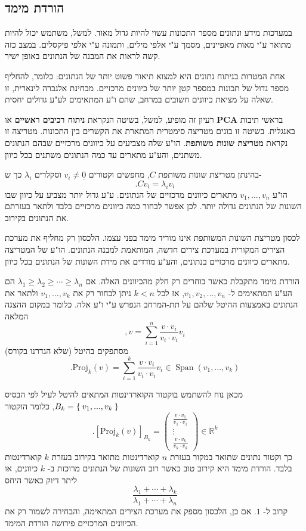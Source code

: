 \documentclass[12pt]{report}
\theoremstyle{plain}
\theoremstyle{definition}
\newcommand{\R}{\mathbb{R}}
\newcommand{\0}{\mathbf{0}}
\DeclareMathOperator{\Span}{Span}
\begin{document}
\subsection*{הורדת מימד}

במערכות מידע ונתונים מספר התכונות עשוי להיות גדול מאוד.
למשל, משתמש יכול להיות מתואר ע"י מאות מאפיינים, מסמך ע"י אלפי מילים, ותמונה ע"י אלפי פיקסלים.
במצב כזה קשה לראות את המבנה של הנתונים באופן ישיר.

אחת המטרות בניתוח נתונים היא למצוא תיאור פשוט יותר של הנתונים:
כלומר, להחליף מספר גדול של תכונות במספר קטן יותר של כיוונים מרכזיים.
מבחינת אלגברה לינארית, זו שאלה על מציאת כיוונים חשובים במרחב, שהם ו"ע המתאימים לע"ע גדולים יחסית.

רעיון זה מופיע, למשל, בשיטה הנקראת
\textbf{ניתוח רכיבים ראשיים}
או 
\textbf{PCA}
בראשי תיבות באנגלית.
בשיטה זו בונים מטריצה סימטרית המתארת את הקשרים בין התכונות.
מטריצה זו נקראת
\textbf{מטריצת שונות משותפת}.
הו"ע שלה מצביעים על כיוונים מרכזיים שבהם הנתונים משתנים, והע"ע מתארים עד כמה הנתונים משתנים בכל כיוון.

בהינתן מטריצת שונות משותפת
$C$,
מחפשים וקטורים
$v_i\neq\underline{0}$
וסקלרים
$\lambda_i$
כך ש-
$$
.Cv_i=\lambda_i v_i
$$
הו"ע
$v_1,...,v_n$
מתארים כיוונים מרכזיים של הנתונים. ע"ע גדול יותר מצביע על כיוון שבו השונות של הנתונים גדולה יותר.
לכן אפשר לבחור כמה כיוונים מרכזיים בלבד ולתאר בעזרתם את הנתונים בקירוב.

לכסון מטריצת השונות המשותפת אינו מוריד מימד בפני עצמו.
הלכסון רק מחליף את מערכת הצירים המקורית במערכת צירים חדשה, המותאמת למבנה הנתונים.
הו"ע של המטריצה מתארים כיוונים מרכזיים בנתונים, והע"ע מודדים את מידת השונות של הנתונים בכל כיוון.

הורדת מימד מתקבלת כאשר בוחרים רק חלק מהכיוונים האלה. אם
$\lambda_1 \geq \lambda_2 \geq \cdots \geq \lambda_n$
הם הע"ע המתאימים ל-
$v_1,v_2,\ldots,v_n$,
אז לכל
$k<n$
ניתן לבחור רק את
$v_1,\ldots,v_k$
ולתאר את הנתונים באמצעות ההיטל שלהם על תת-המרחב הנפרש ע"י ו"ע אלה. כלומר במקום ההצגה המלאה
$$
,v=\sum_{i=1}^n\frac{v\cdot v_i}{v_i \cdot v_i}v_i
$$
מסתפקים בהיטל (שלא הגדרנו בקורס)
$$
.\text{Proj}_k(v)=\sum_{i=1}^k\frac{v\cdot v_i}{v_i \cdot v_i}v_i\in\Span(v_1,...,v_k)
$$

מכאן נוח להשתמש בוקטור הקוארדינטות המתאים להיטל לעיל לפי הבסיס 
$B_k=\Set{v_1,...,v_k}$,
כלומר הוקטור
$$
.[\text{Proj}_k(v)]_{B_k}=\begin{pmatrix}\frac{v\cdot v_1}{v_1 \cdot v_1}\\\vdots\\\frac{v\cdot v_k}{v_k \cdot v_k}\end{pmatrix}\in\R^k
$$
כך וקטור נתונים שתואר במקור בעזרת
$n$
קוארדינטות מתואר בקירוב בעזרת
$k$
קוארדינטות בלבד. הורדת מימד היא קירוב טוב כאשר רוב השונות של הנתונים מרוכזת ב-
$k$
כיוונים, או ליתר דיוק כאשר היחס
$$
\frac{\lambda_1+\cdots+\lambda_k}
{\lambda_1+\cdots+\lambda_n}
$$
קרוב ל-
$1$.
אם כן, הלכסון מספק את מערכת הצירים המתאימה, והבחירה לשמור רק את הכיוונים המרכזיים פירושה הורדת המימד.
\end{document}
